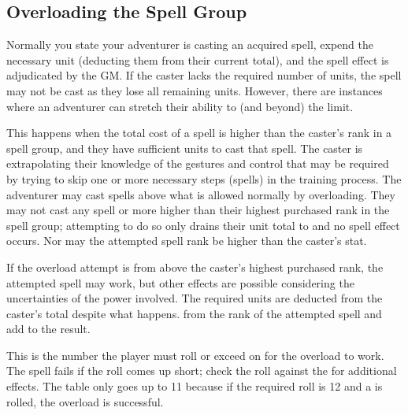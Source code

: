 \begin{multicols}{2}
\subsection{Overloading the Spell Group}
Normally you state your adventurer is casting an acquired spell, expend the necessary unit (deducting them from their current total), and the spell effect is adjudicated by the GM. If the caster lacks the required number of units, the spell may not be cast as they lose all remaining units. However, there are instances where an adventurer can stretch their ability to (and beyond) the limit.

This happens when the total cost of a spell is higher than the caster's rank in a spell group, and they have sufficient units to cast that spell. The caster is extrapolating their knowledge of the gestures and control that may be required by trying to skip one or more necessary steps (spells) in the training process. The adventurer may cast spells above what is allowed normally by overloading. They may not cast any spell  or more higher than their highest purchased rank in the spell group; attempting to do so only drains their unit total to  and no spell effect occurs. Nor may the attempted spell rank be higher than the caster's \PWR stat.

If the overload attempt is from  above the caster's highest purchased rank, the attempted spell may work, but other effects are possible considering the uncertainties of the power involved. The required units are deducted from the caster's total despite what happens.  from the rank of the attempted spell and add  to the result. 

This is the number the player must roll or exceed on  for the overload to work. The spell fails if the roll comes up short; check the roll against the  for additional effects. The table only goes up to 11 because if the required roll is 12 and a  is rolled, the overload is successful.\\




\end{multicols}
